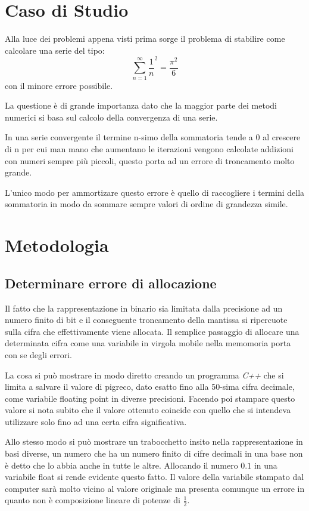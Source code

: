 \documentclass{article}
\begin{document}
\section{Caso di Studio}

Alla luce dei problemi appena visti prima sorge il problema di stabilire come calcolare una serie del tipo:
	\begin{equation}
\sum_{n=1}^{\infty}\frac{1}{n}^{2}= \frac{\pi^{2}}{6}
	\end{equation}
con il minore errore possibile.

La questione è di grande importanza dato che la maggior parte dei metodi numerici si basa sul calcolo della convergenza di una serie.

In una serie convergente il termine n-simo della sommatoria tende a 0 al crescere di n per cui man mano che aumentano le iterazioni vengono calcolate addizioni con numeri sempre più piccoli, questo porta ad un errore di troncamento molto grande.

L'unico modo per ammortizare questo errore è quello di raccogliere i termini della sommatoria in modo da sommare sempre valori di ordine di grandezza simile.


\section{Metodologia}

\subsection{Determinare errore di allocazione}
Il fatto che la rappresentazione in binario sia limitata dalla precisione ad un numero finito di bit e il conseguente troncamento della mantissa si ripercuote sulla cifra che effettivamente viene allocata.
Il semplice passaggio di allocare una determinata cifra come una variabile in virgola mobile nella memomoria porta con se degli errori.

La cosa si può mostrare in modo diretto creando un programma \emph{C++} che si limita a salvare il valore di pigreco, dato esatto fino alla 50-sima cifra decimale, come variabile floating point in diverse precisioni. 
Facendo poi stampare questo valore si nota subito che il valore ottenuto coincide con quello che si intendeva utilizzare solo fino ad una certa cifra significativa.

Allo stesso modo si può mostrare un trabocchetto insito nella rappresentazione in basi diverse, un numero che ha un numero finito di cifre decimali in una base non è detto che lo abbia anche in tutte le altre.
Allocando il numero $0.1$ in una variabile float si rende evidente questo fatto. Il valore della variabile stampato dal computer sarà molto vicino al valore originale ma presenta comunque un errore in quanto non è composizione lineare di potenze di $\frac{1}{2}$.
\end{document}
